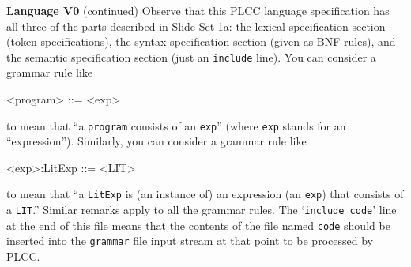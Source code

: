 \begin{minipage}[t]{\sw}
\slidenumber
\LARGE
{\bf Language V0} (continued)\exx
Observe that this PLCC language specification has all three
of the parts described in Slide Set 1a:
the lexical specification section (token specifications), 
the syntax specification section (given as BNF rules),
and the semantic specification section (just an \verb'include' line).\exx
You can consider a grammar rule like
{\Large
\begin{qv}
<program>        ::= <exp>
\end{qv}
}
to mean that ``a \verb'program' consists of an \verb'exp'''
(where \verb'exp' stands for an ``expression'').
Similarly, you can consider a grammar rule like
{\Large
\begin{qv}
<exp>:LitExp     ::= <LIT>
\end{qv}
}
to mean that ``a \verb'LitExp' is (an instance of) an expression (an \verb'exp')
that consists of a \verb'LIT'.''
Similar remarks apply to all the grammar rules.\exx
The `\verb'include code'' line at the end of this file
means that the contents of the file named \verb'code'
should be inserted into the \verb'grammar' file input stream
at that point to be processed by PLCC.
\end{minipage}
\clearpage
